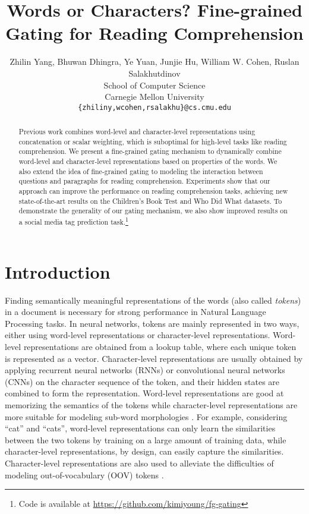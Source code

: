 \documentclass{article} \usepackage{iclr2017_conference,times}
\title{Words or Characters? Fine-grained Gating for Reading Comprehension}
\author{Zhilin Yang, Bhuwan Dhingra, Ye Yuan, Junjie Hu, William W. Cohen, Ruslan Salakhutdinov\\
School of Computer Science\\
Carnegie Mellon University\\
\texttt{\{zhiliny,wcohen,rsalakhu\}@cs.cmu.edu}\\
}
\begin{document}
\maketitle


\begin{abstract}

Previous work combines word-level and character-level representations using concatenation or scalar weighting, which is suboptimal for high-level tasks like reading comprehension. We present a fine-grained gating mechanism to dynamically combine word-level and character-level representations based on properties of the words. We also extend the idea of fine-grained gating to modeling the interaction between questions and paragraphs for reading comprehension. Experiments show that our approach can improve the performance on reading comprehension tasks, achieving new state-of-the-art results on the Children's Book Test and Who Did What datasets. To demonstrate the generality of our gating mechanism, we also show improved results on a social media tag prediction task.\footnote{Code is available at \url{https://github.com/kimiyoung/fg-gating}}

\end{abstract}
 
\section{Introduction}
\vspace{-0.0in}
Finding semantically meaningful representations of the words (also called \textit{tokens}) in a document is necessary for strong performance in Natural Language Processing tasks. In neural networks, tokens are mainly represented in two ways, either using word-level representations or character-level representations. Word-level representations are obtained from a lookup table, where each unique token is represented as a vector. Character-level representations are usually obtained by applying recurrent neural networks (RNNs) or convolutional neural networks (CNNs) on the character sequence of the token, and their hidden states are combined to form the representation. Word-level representations are good at memorizing the semantics of the tokens while character-level representations are more suitable for modeling sub-word morphologies \citep{ling2015finding,yang2016multi}. For example, considering ``cat'' and ``cats'', word-level representations can only learn the similarities between the two tokens by training on a large amount of training data, while character-level representations, by design, can easily capture the similarities. Character-level representations are also used to alleviate the difficulties of modeling out-of-vocabulary (OOV) tokens \citep{luong2016achieving}.
\end{document}
